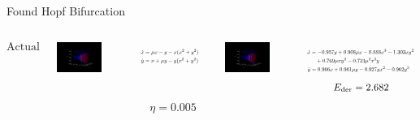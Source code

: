 \documentclass[aspectratio=169]{beamer}
\begin{document}
\begin{frame}{Found Hopf Bifurcation}
	\begin{columns}
		\[ \text{Actual} \]
		\begin{center}
			\includegraphics[width=0.7\textwidth, trim = {4cm, 2cm, 4cm, 2.5cm}, clip]{hopf_normal_actual.pdf}
		\end{center}
		\begin{equation*}
			\resizebox{!}{1.2em}{$
			\begin{aligned}
			\dot x &= \mu x - y - x(x^2 + y^2) \\
			\dot y &= x + \mu y - y(x^2 + y^2) \\
			&\phantom{+ 0.769\mu xy^2 -0.723 \mu^2 x^2y} 
			\end{aligned}
			$}
		\end{equation*}
		\[\text{\small $\phantom{E_\text{der} = 0.00136}$}\]
		\[ \eta = 0.005 \]
		\begin{center}
			\includegraphics[width=0.7\textwidth, trim = {4cm, 2cm, 4cm, 2.5cm}, clip]{found_hopf_bifurcation_0005.pdf}
		\end{center}
		\begin{equation*}
			\resizebox{!}{1.2em}{$
			\begin{aligned}
				\dot x &= -0.957y + 0.908\mu x -0.888x^3 -1.303xy^2 \\
				&\quad  + 0.769\mu xy^2 -0.723 \mu^2 x^2y \\ 
				\dot y &= 0.966x + 0.961\mu y -0.927yx^2 - 0.962y^3
			\end{aligned}
			$}
		\end{equation*}
		\[\text{\small $E_\text{der} = 2.682$}\]
	\end{columns}
\end{frame}
\end{document}
